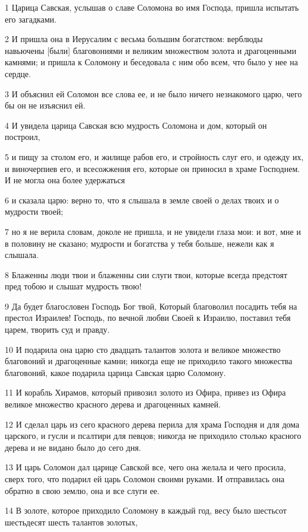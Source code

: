 \par 1 Царица Савская, услышав о славе Соломона во имя Господа, пришла испытать его загадками.
\par 2 И пришла она в Иерусалим с весьма большим богатством: верблюды навьючены [были] благовониями и великим множеством золота и драгоценными камнями; и пришла к Соломону и беседовала с ним обо всем, что было у нее на сердце.
\par 3 И объяснил ей Соломон все слова ее, и не было ничего незнакомого царю, чего бы он не изъяснил ей.
\par 4 И увидела царица Савская всю мудрость Соломона и дом, который он построил,
\par 5 и пищу за столом его, и жилище рабов его, и стройность слуг его, и одежду их, и виночерпиев его, и всесожжения его, которые он приносил в храме Господнем. И не могла она более удержаться
\par 6 и сказала царю: верно то, что я слышала в земле своей о делах твоих и о мудрости твоей;
\par 7 но я не верила словам, доколе не пришла, и не увидели глаза мои: и вот, мне и в половину не сказано; мудрости и богатства у тебя больше, нежели как я слышала.
\par 8 Блаженны люди твои и блаженны сии слуги твои, которые всегда предстоят пред тобою и слышат мудрость твою!
\par 9 Да будет благословен Господь Бог твой, Который благоволил посадить тебя на престол Израилев! Господь, по вечной любви Своей к Израилю, поставил тебя царем, творить суд и правду.
\par 10 И подарила она царю сто двадцать талантов золота и великое множество благовоний и драгоценные камни; никогда еще не приходило такого множества благовоний, какое подарила царица Савская царю Соломону.
\par 11 И корабль Хирамов, который привозил золото из Офира, привез из Офира великое множество красного дерева и драгоценных камней.
\par 12 И сделал царь из сего красного дерева перила для храма Господня и для дома царского, и гусли и псалтири для певцов; никогда не приходило столько красного дерева и не видано было до сего дня.
\par 13 И царь Соломон дал царице Савской все, чего она желала и чего просила, сверх того, что подарил ей царь Соломон своими руками. И отправилась она обратно в свою землю, она и все слуги ее.
\par 14 В золоте, которое приходило Соломону в каждый год, весу было шестьсот шестьдесят шесть талантов золотых,
